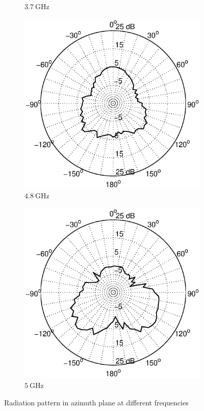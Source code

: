 \documentclass[a4paper]{article}        %
\begin{document}
\begin{figure}[H]
\begin{subfigure}{0.5\textwidth}
			\caption{$\SI{3.7}{\giga\hertz}$}
		\end{subfigure}
		\begin{subfigure}{0.5\textwidth}
			\includegraphics[width=\textwidth]{images/antenna/radpat_azi_4_8G}
			\caption{$\SI{4.8}{\giga\hertz}$}
		\end{subfigure}
		\begin{subfigure}{0.5\textwidth}
			\includegraphics[width=\textwidth]{images/antenna/radpat_azi_5G}
			\caption{$\SI{5}{\giga\hertz}$}
		\end{subfigure}
		\caption{Radiation pattern in azimuth plane at different frequencies}
		\label{fig:ant_radpat}
		\end{figure}
\end{document}
